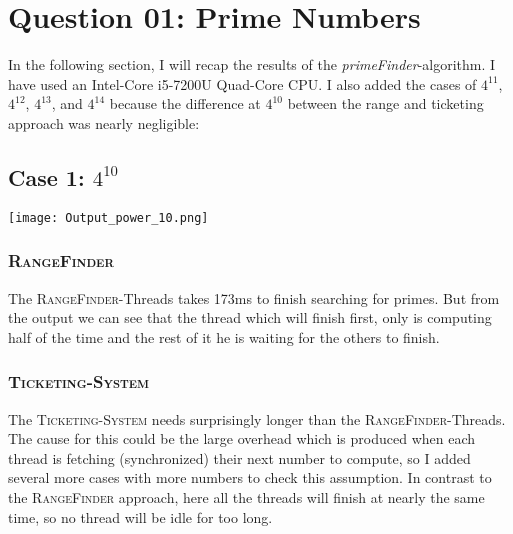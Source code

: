 \documentclass{article}
\begin{document}
	\pagestyle{fancy}
	
	\section*{Question 01: Prime Numbers}
	\begin{adjustwidth}{2em}{2em}
		In the following section, I will recap the results of the \textit{primeFinder}-algorithm. I have used an Intel-Core i5-7200U Quad-Core CPU. I also added the cases of $4^{11}$, $4^{12}$, $4^{13}$, and $4^14$ because the difference at $4^{10}$ between the range and ticketing approach was nearly negligible:
		\subsection*{Case 1: $4^{10}$}
		\begin{adjustwidth}{2em}{2em}
			\texttt{[image: Output\_power\_10.png]}
			\subsubsection*{\textsc{RangeFinder}}
			\begin{adjustwidth}{1em}{}
				The \textsc{RangeFinder}-Threads takes 173ms to finish searching for primes. But from the output we can see that the thread which will finish first, only is computing half of the time and the rest of it he is waiting for the others to finish.
			\end{adjustwidth}
			\subsubsection*{\textsc{Ticketing-System}}
			\begin{adjustwidth}{1em}{}
				The \textsc{Ticketing-System} needs surprisingly longer than the \textsc{RangeFinder}-Threads. The cause for this could be the large overhead which is produced when each thread is fetching (synchronized) their next number to compute, so I added several more cases with more numbers to check this assumption. In contrast to the \textsc{RangeFinder} approach, here all the threads will finish at nearly the same time, so no thread will be idle for too long.
			\end{adjustwidth}

\end{adjustwidth}
\end{adjustwidth}
\end{document}
